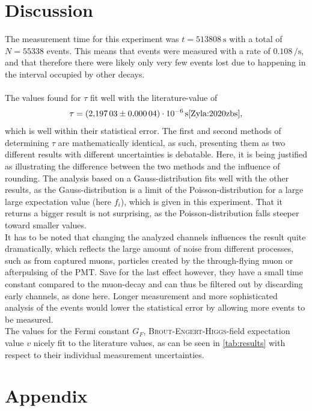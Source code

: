 \documentclass[english,  %
parskip=full,   %
headsepline]{scrartcl}
\begin{document}
\section{Discussion}
The measurement time for this experiment was $t=\SI{513808}{\second}$ with a total of \\$N=55338$ events. This means that events were measured with a rate of $0.108\,\si{\per\second}$, and that therefore there were likely only very few events lost due to happening in the interval occupied by other decays.\\\\
The values found for $\tau$ fit well with the literature-value of \[\tau=\SI{2.19703\pm0.00004e-6}{s} \cite{Zyla:2020zbs},\] which is well within their statistical error. The first and second methods of determining $\tau$ are mathematically identical, as such, presenting them as two different results with different uncertainties is debatable. Here, it is being justified as illustrating the difference between the two methods and the influence of rounding. The analysis based on a Gauss-distribution fits well with the other results, as the Gauss-distribution is a limit of the Poisson-distribution for a large large expectation value (here $f_i$), which is given in this experiment. That it returns a bigger result is not surprising, as the Poisson-distribution falls steeper toward smaller values. \\
It has to be noted that changing the analyzed channels influences the result quite dramatically, which reflects the large amount of noise from different processes, such as from captured muons, particles created by the through-flying muon or afterpulsing of the PMT. Save for the last effect however, they have a small time constant compared to the muon-decay and can thus be filtered out by discarding early channels, as done here. Longer measurement and more sophisticated analysis of the events would lower the statistical error by allowing more events to be measured.\\
The values for the Fermi constant $G_F$, \textsc{Brout-Engert-Higgs}-field expectation value $v$ nicely fit to the literature values, as can be seen in \cref{tab:results} with respect to their individual measurement uncertainties.


\printbibliography

\section{Appendix}
\end{document}
